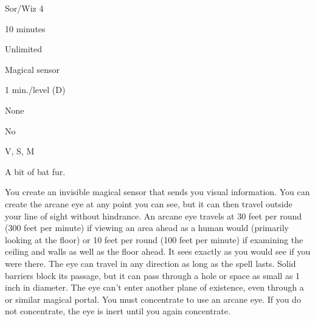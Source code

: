 
\begin{description*}
\item[Level:] Sor/Wiz 4
\item[Casting Time:] 10 minutes
\item[Range:] Unlimited
\item[Effect:] Magical sensor
\item[Duration:] 1 min./level (D)
\item[Saving Throw:] None
\item[Spell Resistance:] No
\item[Components:] V, S, M
\item[Arcane Material Component:] A bit of bat fur.
\end{description*}

You create an invisible magical sensor that sends you visual information. You can
create the arcane eye at any point you can see, but it can then travel
outside your line of sight without hindrance. An arcane eye travels at
30 feet per round (300 feet per minute) if viewing an area ahead as a human would
(primarily looking at the floor) or 10 feet per round (100 feet per minute) if
examining the ceiling and walls as well as the floor ahead. It sees exactly as
you would see if you were there.
The eye can travel in any direction as long as the spell lasts. Solid barriers
block its passage, but it can pass through a hole or space as small as 1 inch in
diameter. The eye can't enter another plane of existence, even through a 
or similar magical portal.
You must concentrate to use an arcane eye. If you do not concentrate,
the eye is inert until you again concentrate.